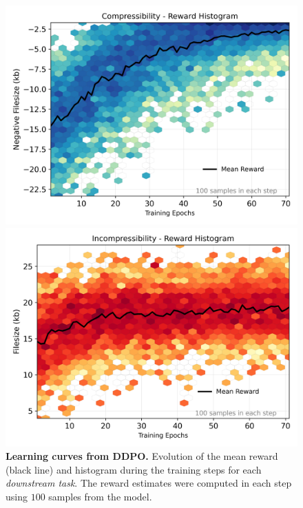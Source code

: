 \begin{figure}[ht]
  \begin{minipage}{0.5\textwidth}
      \centering
      \includegraphics[width=1\textwidth]{img/results/reward_hist-jpeg-compressibility.png} %
  \end{minipage}\hfill
  \begin{minipage}{0.5\textwidth}
      \centering
      \includegraphics[width=1\textwidth]{img/results/reward_hist-jpeg-incompressibility.png} %
  \end{minipage}
  \vspace{-8pt}  %
    \captionsetup{width=\textwidth} %
    \caption{\textbf{Learning curves from DDPO.} Evolution of the mean reward (black line) and histogram during the training steps for each \textit{downstream task}. The reward estimates were computed in each step using $100$ samples from the model.}
  \label{fig:reward_hist} %
\end{figure}

